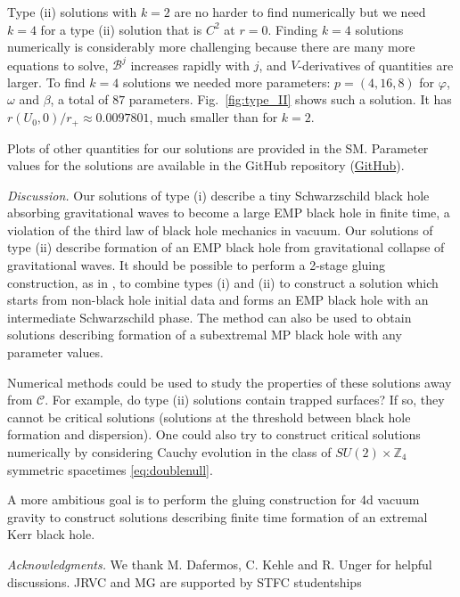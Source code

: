 \documentclass[prl,twocolumn,superscriptaddress,nofootinbib]{revtex4-2}
\begin{document}
Type (ii) solutions with $k=2$ are no harder to find numerically but we need $k=4$ for a type (ii) solution that is $C^2$ at $r=0$. Finding $k=4$ solutions numerically is considerably more challenging because there are many more equations to solve, $\mathcal{B}^j$ increases rapidly with $j$, and $V$-derivatives of quantities are larger. To find $k=4$ solutions we needed more parameters: $p=(4,16,8)$ for $\varphi$, $\omega$ and $\beta$, a total of $87$ parameters. Fig.~\ref{fig:type_II} shows such a solution. It has $r(U_0,0)/r_+ \approx 0.0097801$, much smaller than for $k=2$.

Plots of other quantities for our solutions are provided in the SM. Parameter values for the solutions are  available in the GitHub repository (\href{https://github.com/jorgealberich/Violation-of-the-third-law-of-black-hole-mechanics-in-vacuum-gravity}{GitHub}).

{\it Discussion.} Our solutions of type (i) describe a tiny Schwarzschild black hole absorbing gravitational waves to become a large EMP black hole in finite time, a violation of the third law of black hole mechanics in vacuum. Our solutions of type (ii) describe formation of an EMP black hole from gravitational collapse of gravitational waves. It should be possible to perform a 2-stage gluing construction, as in \cite{Kehle:2022uvc}, to combine types (i) and (ii) to construct a solution which starts from non-black hole initial data and forms an EMP black hole with an intermediate Schwarzschild phase. The method can also be used to obtain solutions describing formation of a subextremal MP black hole with any parameter values.

Numerical methods could be used to study the properties of these solutions away from $\mathcal{C}$. For example, do type (ii) solutions contain trapped surfaces? If so, they cannot be critical solutions \cite{Kehle:2024vyt} (solutions at the threshold between black hole formation and dispersion). One could also try to construct critical solutions numerically by considering Cauchy evolution in the class of $SU(2) \times \mathbb{Z}_4$ symmetric spacetimes \eqref{eq:doublenull}.

A more ambitious goal is to perform the gluing construction for 4d vacuum gravity to construct solutions describing finite time formation of an extremal Kerr black hole.

{\it Acknowledgments.}
We thank M. Dafermos, C. Kehle and R. Unger for helpful discussions.
JRVC and MG are supported by STFC studentships
\end{document}
